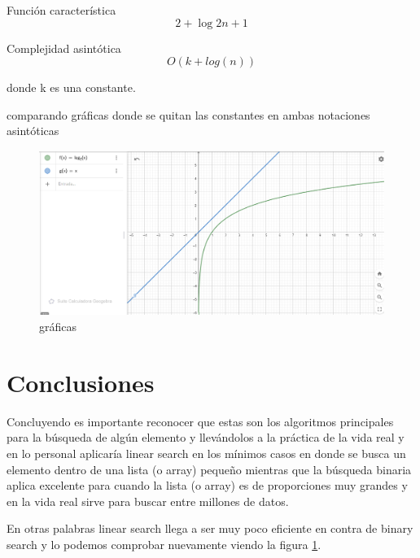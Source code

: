 \documentclass{article}
\begin{document}
\begin{multicols}{2}
    Función característica
    \begin{equation*}
      2 + \log2 n+1
    \end{equation*}

    Complejidad asintótica
    \begin{equation*}
      O(k + log(n))
    \end{equation*}

    donde k es una constante.

    comparando gráficas donde se quitan las constantes en ambas notaciones asintóticas

    \begin{figure}[H]
      \includegraphics*[scale=0.2]{imgs/t2.png}
      \caption{gráficas}
      \label{Fig:3}
    \end{figure}
\section{Conclusiones}\label{Conclusiones}				%
Concluyendo es importante reconocer que estas son los algoritmos principales para la búsqueda de algún
elemento y llevándolos a la práctica de la vida real y en lo personal aplicaría linear search en los mínimos casos
en donde se busca un elemento dentro de una lista (o array) pequeño mientras que la búsqueda binaria aplica excelente para cuando
la lista (o array) es de proporciones muy grandes y en la vida real sirve para buscar entre millones de datos.

En otras palabras linear search llega a ser muy poco eficiente en contra de binary search y lo podemos comprobar nuevamente
 viendo la figura \ref{Fig:3}.
\end{multicols}
\end{document}
